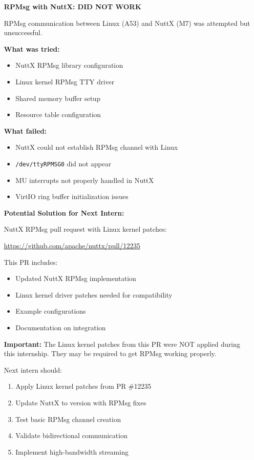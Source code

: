 \documentclass[12pt,a4paper]{report}
\begin{document}
\begin{important}
\textbf{RPMsg with NuttX: DID NOT WORK}

RPMsg communication between Linux (A53) and NuttX (M7) was attempted but unsuccessful.

\textbf{What was tried:}
\begin{itemize}
    \item NuttX RPMsg library configuration
    \item Linux kernel RPMsg TTY driver
    \item Shared memory buffer setup
    \item Resource table configuration
\end{itemize}

\textbf{What failed:}
\begin{itemize}
    \item NuttX could not establish RPMsg channel with Linux
    \item \texttt{/dev/ttyRPMSG0} did not appear
    \item MU interrupts not properly handled in NuttX
    \item VirtIO ring buffer initialization issues
\end{itemize}

\end{important}

\begin{docref}
\textbf{Potential Solution for Next Intern:}

NuttX RPMsg pull request with Linux kernel patches:

\url{https://github.com/apache/nuttx/pull/12235}

This PR includes:
\begin{itemize}
    \item Updated NuttX RPMsg implementation
    \item Linux kernel driver patches needed for compatibility
    \item Example configurations
    \item Documentation on integration
\end{itemize}

\textbf{Important:} The Linux kernel patches from this PR were NOT applied during this internship. They may be required to get RPMsg working properly.

Next intern should:
\begin{enumerate}
    \item Apply Linux kernel patches from PR \#12235
    \item Update NuttX to version with RPMsg fixes
    \item Test basic RPMsg channel creation
    \item Validate bidirectional communication
    \item Implement high-bandwidth streaming
\end{enumerate}
\end{docref}
\end{document}
